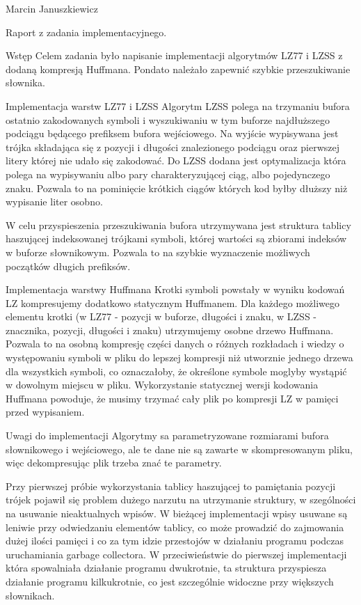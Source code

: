 \documentclass[11pt,leqno]{article}
\begin{document}
Marcin Januszkiewicz


Raport z zadania implementacyjnego.

\begin{section}{Wstęp}
Celem zadania było napisanie implementacji algorytmów LZ77 i LZSS z dodaną kompresją Huffmana. Pondato należało zapewnić szybkie przeszukiwanie słownika.
\end{section}

\begin{section}{Implementacja warstw LZ77 i LZSS}
Algorytm LZSS polega na trzymaniu bufora ostatnio zakodowanych symboli i wyszukiwaniu w tym buforze najdłuższego podciągu będącego prefiksem bufora wejściowego. Na wyjście wypisywana jest trójka składająca się z pozycji i długości znalezionego podciągu oraz pierwszej litery której nie udało się zakodować. Do LZSS dodana jest optymalizacja która polega na wypisywaniu albo pary charakteryzującej ciąg, albo pojedynczego znaku. Pozwala to na pominięcie krótkich ciągów których kod byłby dłuższy niż wypisanie liter osobno.

W celu przyspieszenia przeszukiwania bufora utrzymywana jest struktura tablicy haszującej indeksowanej trójkami symboli, której wartości są zbiorami indeksów w buforze słownikowym. Pozwala to na szybkie wyznaczenie możliwych początków długich prefiksów.

\end{section}

\begin{section}{Implementacja warstwy Huffmana}
Krotki symboli powstały w wyniku kodowań LZ kompresujemy dodatkowo statycznym Huffmanem. Dla każdego możliwego elementu krotki (w LZ77 - pozycji w buforze, długości i znaku, w LZSS - znacznika, pozycji, długości i znaku) utrzymujemy osobne drzewo Huffmana. Pozwala to na osobną kompresję części danych o różnych rozkładach i wiedzy o występowaniu symboli w pliku do lepszej kompresji niż utworznie jednego drzewa dla wszystkich symboli, co oznaczałoby, że określone symbole moglyby wystąpić w dowolnym miejscu w pliku. Wykorzystanie statycznej wersji kodowania Huffmana powoduje, że musimy trzymać cały plik po kompresji LZ w pamięci przed wypisaniem.


\end{section}

\begin{section}{Uwagi do implementacji}
Algorytmy sa parametryzowane rozmiarami bufora słownikowego i wejściowego, ale te dane nie są zawarte w skompresowanym pliku, więc dekompresując plik trzeba znać te parametry.

Przy pierwszej próbie wykorzystania tablicy haszującej to pamiętania pozycji trójek pojawił się problem dużego narzutu na utrzymanie struktury, w szególności na usuwanie nieaktualnych wpisów. W bieżącej implementacji wpisy usuwane są leniwie przy odwiedzaniu elementów tablicy, co może prowadzić do zajmowania dużej ilości pamięci i co za tym idzie przestojów w działaniu programu podczas uruchamiania garbage collectora. W przeciwieństwie do pierwszej implementacji która spowalniała działanie programu dwukrotnie, ta struktura przyspiesza działanie programu kilkukrotnie, co jest szczególnie widoczne przy większych słownikach.
\end{section}
\end{document}
